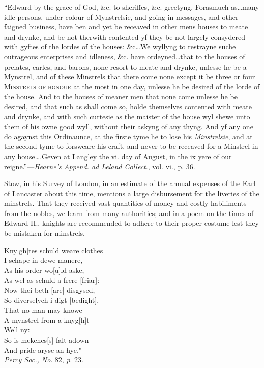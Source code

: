 “Edward by the grace of God, \&c. to sheriffes, \&c. greetyng, Forasmuch as\ldots  many
idle persons, under colour of Mynstrelsie, and going in messages, and other faigned
business, have ben and yet be receaved in other mens houses to meate and drynke, and
be not therwith contented yf they be not largely consydered with gyftes of the lordes
of the houses: \&c\ldots We wyllyng to restrayne suche outrageous enterprises and idleness,
\&c. have ordeyned\ldots that to the houses of prelates, earles, and barons, none
resort to meate and drynke, unlesse he be a Mynstrel, and of these Minstrels that there
come none except it be three or four \textsc{Minstrels of honour} at the most in one day,
unlesse he be desired of the lorde of the house. \pagebreak 
And to the houses of meaner men
that none come unlesse he be desired, and that such as shall come so, holde themselves
contented with meate and drynke, and with such curtesie as the maister of the house
wyl shewe unto them of his owne good wyll, without their askyng of any thyng.
And yf any one do agaynst this Ordinaunce, at the firste tyme he to lose his \textit{Minstrelsie},
and at the second tyme to forsweare his craft, and never to be receaved for
a Minstrel in any house\ldots .Geven at Langley the vi. day of August, in the ix yere of
our reigne.”—\textit{Hearne’s Append. ad Leland Collect}., vol. vi., p. 36.

Stow, in his Survey of London, in an estimate of the annual expenses of
the Earl of Lancaster about this time, mentions a large disbursement for the
liveries of the minstrels. That they received vast quantities of money and costly
habiliments from the nobles, we learn from many authorities; and in a poem on
the times of Edward II., knights are recommended to adhere to their proper
costume lest they be mistaken for minstrels.

\settowidth{\versewidth}{“Kny[gh]tes schuld weare clothes}
\begin{dcverse}
\begin{patverse}
Kny[gh]tes schuld weare clothes\\
I-schape in dewe manere,\\
As his order wo[u]ld aske,\\
As wel as schuld a frere [friar]:\\
Now thei beth [are] disgysed,\\
So diverselych i-digt [bedight],\\
That no man may knowe\\
A mynstrel from a knyg[h]t\\
Well ny:\\
So is mekenes[s] falt adown\\
And pride aryse an hye."\\
\textit{Percy Soc., No}. 82, \textit{p}. 23.
\end{patverse}
\end{dcverse}


